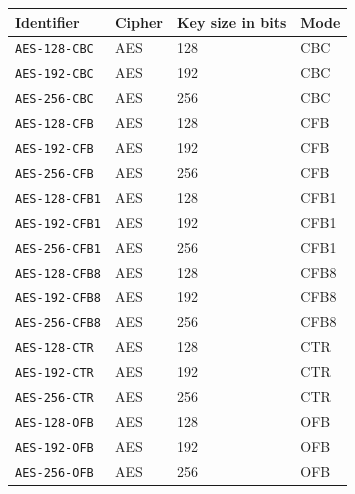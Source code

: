 \documentclass[synpaper]{book}
\begin{document}
\begin{table}[H]
\begin{small}
\begin{tabular}{|l|l|l|l|}
\hline \textbf{Identifier}        & \textbf{Cipher} & \textbf{Key size in bits} & \textbf{Mode} \\
\hline \texttt{AES-128-CBC}       & AES             & 128                       & CBC    \\
\hline \texttt{AES-192-CBC}       & AES             & 192                       & CBC    \\
\hline \texttt{AES-256-CBC}       & AES             & 256                       & CBC    \\
\hline \texttt{AES-128-CFB}       & AES             & 128                       & CFB    \\
\hline \texttt{AES-192-CFB}       & AES             & 192                       & CFB    \\
\hline \texttt{AES-256-CFB}       & AES             & 256                       & CFB    \\
\hline \texttt{AES-128-CFB1}      & AES             & 128                       & CFB1   \\
\hline \texttt{AES-192-CFB1}      & AES             & 192                       & CFB1   \\
\hline \texttt{AES-256-CFB1}      & AES             & 256                       & CFB1   \\
\hline \texttt{AES-128-CFB8}      & AES             & 128                       & CFB8   \\
\hline \texttt{AES-192-CFB8}      & AES             & 192                       & CFB8   \\
\hline \texttt{AES-256-CFB8}      & AES             & 256                       & CFB8   \\
\hline \texttt{AES-128-CTR}       & AES             & 128                       & CTR    \\
\hline \texttt{AES-192-CTR}       & AES             & 192                       & CTR    \\
\hline \texttt{AES-256-CTR}       & AES             & 256                       & CTR    \\
\hline \texttt{AES-128-OFB}       & AES             & 128                       & OFB    \\
\hline \texttt{AES-192-OFB}       & AES             & 192                       & OFB    \\
\hline \texttt{AES-256-OFB}       & AES             & 256                       & OFB    \\

\end{tabular}
\end{small}
\end{table}
\end{document}
